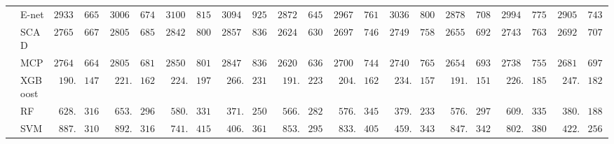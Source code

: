 \begin{tabular}{p{0.2cm}p{1cm}|p{0.6cm}p{0.6cm}|p{0.6cm}p{0.6cm}p{0.6cm}p{0.6cm}p{0.6cm}p{0.6cm}|p{0.6cm}p{0.6cm}p{0.6cm}p{0.6cm}p{0.6cm}p{0.6cm}|p{0.6cm}p{0.6cm}p{0.6cm}p{0.6cm}p{0.6cm}p{0.6cm}}
 & E-net  & $2933.80$ & $665.13$ & $3006.87$ & $674.09$ & $3100.70$ & $815.76$ & $3094.34$ & $925.02$ & $2872.16$ & $645.24$ & $2967.23$ & $761.42$ & $3036.18$ & $800.92$ & $2878.16$ & $708.20$ & $2994.19$ & $775.20$ & $2905.94$ & $743.35$ \\
 & SCAD  & $2765.01$ & $667.33$ & $2805.25$ & $685.93$ & $2842.93$ & $800.46$ & $2857.67$ & $836.40$ & $2624.79$ & $630.71$ & $2697.69$ & $746.83$ & $2749.46$ & $758.05$ & $2655.23$ & $692.99$ & $2743.85$ & $763.93$ & $2692.26$ & $707.46$ \\
 & MCP  & $2764.08$ & $664.05$ & $2805.50$ & $681.74$ & $2850.51$ & $801.61$ & $2847.17$ & $836.86$ & $2620.82$ & $636.40$ & $2700.59$ & $744.39$ & $2740.88$ & $765.51$ & $2654.15$ & $693.92$ & $2738.18$ & $755.57$ & $2681.04$ & $697.26$ \\
 & XGBoost  & $\phantom{0}190.56$ & $147.80$ & $\phantom{0}221.67$ & $162.82$ & $\phantom{0}224.52$ & $197.53$ & $\phantom{0}266.47$ & $231.29$ & $\phantom{0}191.43$ & $223.78$ & $\phantom{0}204.59$ & $162.52$ & $\phantom{0}234.98$ & $157.48$ & $\phantom{0}191.65$ & $151.55$ & $\phantom{0}226.31$ & $185.22$ & $\phantom{0}247.03$ & $182.52$ \\
 & RF  & $\phantom{0}628.39$ & $316.62$ & $\phantom{0}653.49$ & $296.42$ & $\phantom{0}580.00$ & $331.42$ & $\phantom{0}371.76$ & $250.63$ & $\phantom{0}566.90$ & $282.04$ & $\phantom{0}576.37$ & $345.03$ & $\phantom{0}379.97$ & $233.35$ & $\phantom{0}576.74$ & $297.22$ & $\phantom{0}609.49$ & $335.54$ & $\phantom{0}380.92$ & $188.49$ \\
 & SVM  & $\phantom{0}887.99$ & $310.08$ & $\phantom{0}892.64$ & $316.19$ & $\phantom{0}741.60$ & $415.68$ & $\phantom{0}406.45$ & $361.71$ & $\phantom{0}853.20$ & $295.44$ & $\phantom{0}833.02$ & $405.90$ & $\phantom{0}459.40$ & $343.12$ & $\phantom{0}847.63$ & $342.78$ & $\phantom{0}802.34$ & $380.53$ & $\phantom{0}422.84$ & $256.70$ \\
\hline 
\end{tabular}

